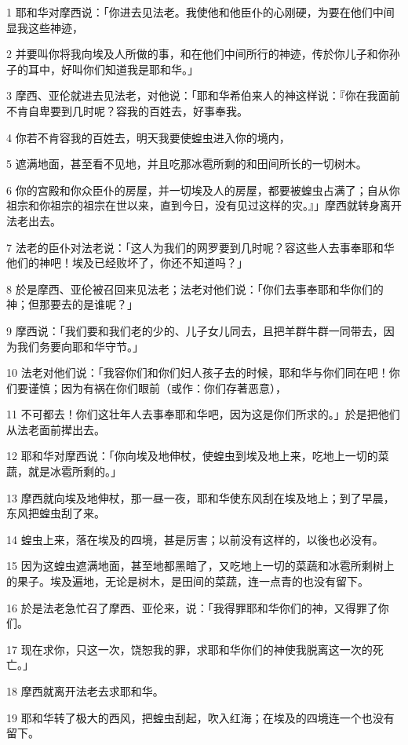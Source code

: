 \par 1 耶和华对摩西说：「你进去见法老。我使他和他臣仆的心刚硬，为要在他们中间显我这些神迹，
\par 2 并要叫你将我向埃及人所做的事，和在他们中间所行的神迹，传於你儿子和你孙子的耳中，好叫你们知道我是耶和华。」
\par 3 摩西、亚伦就进去见法老，对他说：「耶和华希伯来人的神这样说：『你在我面前不肯自卑要到几时呢？容我的百姓去，好事奉我。
\par 4 你若不肯容我的百姓去，明天我要使蝗虫进入你的境内，
\par 5 遮满地面，甚至看不见地，并且吃那冰雹所剩的和田间所长的一切树木。
\par 6 你的宫殿和你众臣仆的房屋，并一切埃及人的房屋，都要被蝗虫占满了；自从你祖宗和你祖宗的祖宗在世以来，直到今日，没有见过这样的灾。』」摩西就转身离开法老出去。
\par 7 法老的臣仆对法老说：「这人为我们的网罗要到几时呢？容这些人去事奉耶和华他们的神吧！埃及已经败坏了，你还不知道吗？」
\par 8 於是摩西、亚伦被召回来见法老；法老对他们说：「你们去事奉耶和华你们的神；但那要去的是谁呢？」
\par 9 摩西说：「我们要和我们老的少的、儿子女儿同去，且把羊群牛群一同带去，因为我们务要向耶和华守节。」
\par 10 法老对他们说：「我容你们和你们妇人孩子去的时候，耶和华与你们同在吧！你们要谨慎；因为有祸在你们眼前（或作：你们存著恶意），
\par 11 不可都去！你们这壮年人去事奉耶和华吧，因为这是你们所求的。」於是把他们从法老面前撵出去。
\par 12 耶和华对摩西说：「你向埃及地伸杖，使蝗虫到埃及地上来，吃地上一切的菜蔬，就是冰雹所剩的。」
\par 13 摩西就向埃及地伸杖，那一昼一夜，耶和华使东风刮在埃及地上；到了早晨，东风把蝗虫刮了来。
\par 14 蝗虫上来，落在埃及的四境，甚是厉害；以前没有这样的，以後也必没有。
\par 15 因为这蝗虫遮满地面，甚至地都黑暗了，又吃地上一切的菜蔬和冰雹所剩树上的果子。埃及遍地，无论是树木，是田间的菜蔬，连一点青的也没有留下。
\par 16 於是法老急忙召了摩西、亚伦来，说：「我得罪耶和华你们的神，又得罪了你们。
\par 17 现在求你，只这一次，饶恕我的罪，求耶和华你们的神使我脱离这一次的死亡。」
\par 18 摩西就离开法老去求耶和华。
\par 19 耶和华转了极大的西风，把蝗虫刮起，吹入红海；在埃及的四境连一个也没有留下。
